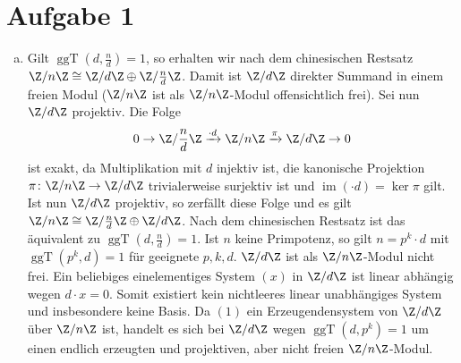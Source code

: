 \documentclass{article}
\newcommand{\im}{\operatorname{im}}
\newcommand{\ggt}{\operatorname{ggT}}
\begin{document}
\section*{Aufgabe 1}
\begin{enumerate}[(a)]
    \item Gilt $\ggt(d, \frac{n}{d}) = 1$, so erhalten wir nach dem chinesischen Restsatz $\Z/n \Z \cong \Z/d\Z \oplus \Z/\frac{n}{d} \Z$.
    Damit ist $\Z/d\Z$ direkter Summand in einem freien Modul ($\Z/n\Z$ ist als $\Z/n\Z$-Modul offensichtlich frei).
    Sei nun $\Z/d\Z$ projektiv.
    Die Folge
    $$0 \to \Z/\frac{n}{d}\Z \xrightarrow{\cdot d} \Z/n\Z \xrightarrow{\pi} \Z/d\Z \to 0$$
    ist exakt, da Multiplikation mit $d$ injektiv ist, die kanonische Projektion $\pi\colon \Z/n\Z \to \Z/d\Z$ trivialerweise 
    surjektiv ist und $\im (\cdot d) = \ker \pi$ gilt.
    Ist nun $\Z/d\Z$ projektiv, so zerfällt diese Folge und es gilt $\Z/n\Z \cong \Z/\frac{n}{d}\Z \oplus \Z/d\Z$.
    Nach dem chinesischen Restsatz ist das äquivalent zu $\ggt(d, \frac{n}{d}) = 1$.
    Ist $n$ keine Primpotenz, so gilt $n = p^k \cdot d$ mit $\ggt(p^k, d) = 1$ für geeignete $p, k, d$.
    $\Z/d\Z$ ist als $\Z/n\Z$-Modul nicht frei. Ein beliebiges einelementiges System $(x)$ in $\Z/d\Z$ ist linear abhängig wegen
    $d\cdot x = 0$. Somit existiert kein nichtleeres linear unabhängiges System und insbesondere keine Basis.
    Da $(1)$ ein Erzeugendensystem von $\Z/d\Z$ über $\Z/n\Z$ ist, handelt es sich bei $\Z/d\Z$ wegen $\ggt(d, p^k) = 1$
    um einen endlich erzeugten und projektiven, aber nicht freien $\Z/n\Z$-Modul.


\end{enumerate}
\end{document}
